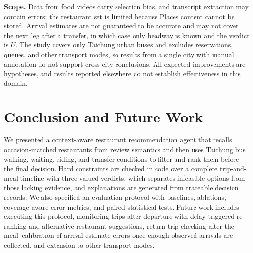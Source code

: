\documentclass[conference]{IEEEtran}
\begin{document}
\textbf{Scope.} Data from food videos carry selection bias, and transcript extraction may contain errors; the restaurant set is limited because Places content cannot be stored. Arrival estimates are not guaranteed to be accurate and may not cover the next leg after a transfer, in which case only headway is known and the verdict is $U$. The study covers only Taichung urban buses and excludes reservations, queues, and other transport modes, so results from a single city with manual annotation do not support cross-city conclusions. All expected improvements are hypotheses, and results reported elsewhere do not establish effectiveness in this domain.

\section{Conclusion and Future Work}\label{sec:conclusion}

We presented a context-aware restaurant recommendation agent that recalls occasion-matched restaurants from review semantics and then uses Taichung bus walking, waiting, riding, and transfer conditions to filter and rank them before the final decision. Hard constraints are checked in code over a complete trip-and-meal timeline with three-valued verdicts, which separates infeasible options from those lacking evidence, and explanations are generated from traceable decision records. We also specified an evaluation protocol with baselines, ablations, coverage-aware error metrics, and paired statistical tests. Future work includes executing this protocol, monitoring trips after departure with delay-triggered re-ranking and alternative-restaurant suggestions, return-trip checking after the meal, calibration of arrival-estimate errors once enough observed arrivals are collected, and extension to other transport modes.



\end{document}
